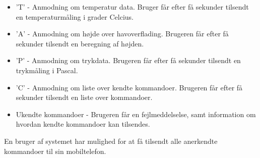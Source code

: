 \begin{itemize}
    \item 'T' - Anmodning om temperatur data. Bruger får efter få sekunder tilsendt en temperaturmåling i grader Celcius.
    \item 'A' - Anmodning om højde over havoverflading. Brugeren får efter få sekunder tilsendt en beregning af højden.
    \item 'P' - Anmodning om trykdata. Brugeren får efter få sekunder tilsendt en trykmåling i Pascal.
    \item 'C' - Anmodning om liste over kendte kommandoer. Brugeren får efter få sekunder tilsendt en liste over kommandoer.
    \item Ukendte kommandoer - Brugeren får en fejlmeddelselse, samt information om hvordan kendte kommandoer kan tilsendes.
\end{itemize}

En bruger af systemet har mulighed for at få tilsendt alle anerkendte kommandoer til sin mobiltelefon.



